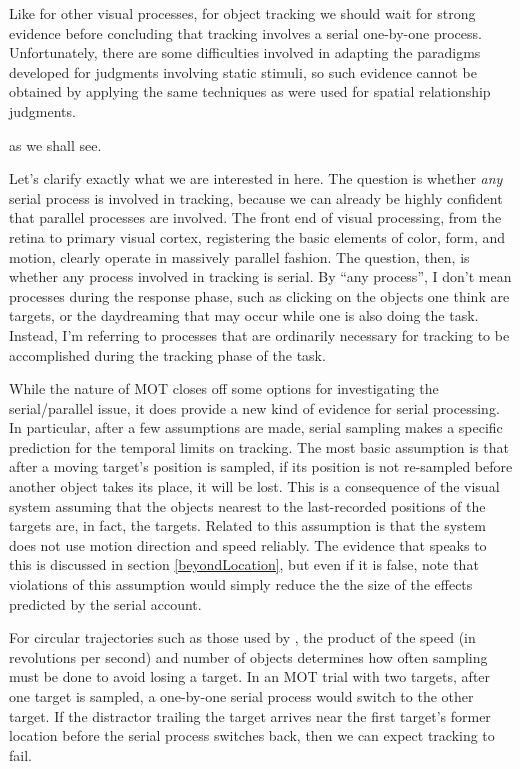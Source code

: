 \documentclass[
]{book}
\begin{document}
Like for other visual processes, for object tracking we should wait for strong evidence before concluding that tracking involves a serial one-by-one process. Unfortunately, there are some difficulties involved in adapting the paradigms developed for judgments involving static stimuli, so such evidence cannot be obtained by applying the same techniques as were used for spatial relationship judgments.

as we shall see.

Let's clarify exactly what we are interested in here. The question is whether \emph{any} serial process is involved in tracking, because we can already be highly confident that parallel processes are involved. The front end of visual processing, from the retina to primary visual cortex, registering the basic elements of color, form, and motion, clearly operate in massively parallel fashion. The question, then, is whether any process involved in tracking is serial. By ``any process'', I don't mean processes during the response phase, such as clicking on the objects one think are targets, or the daydreaming that may occur while one is also doing the task. Instead, I'm referring to processes that are ordinarily necessary for tracking to be accomplished during the tracking phase of the task.

While the nature of MOT closes off some options for investigating the serial/parallel issue, it does provide a new kind of evidence for serial processing. In particular, after a few assumptions are made, serial sampling makes a specific prediction for the temporal limits on tracking. The most basic assumption is that after a moving target's position is sampled, if its position is not re-sampled before another object takes its place, it will be lost. This is a consequence of the visual system assuming that the objects nearest to the last-recorded positions of the targets are, in fact, the targets. Related to this assumption is that the system does not use motion direction and speed reliably. The evidence that speaks to this is discussed in section \ref{beyondLocation}, but even if it is false, note that violations of this assumption would simply reduce the the size of the effects predicted by the serial account.

For circular trajectories such as those used by \citet{holcombeSplittingAttentionReduces2013}, the product of the speed (in revolutions per second) and number of objects determines how often sampling must be done to avoid losing a target. In an MOT trial with two targets, after one target is sampled, a one-by-one serial process would switch to the other target. If the distractor trailing the target arrives near the first target's former location before the serial process switches back, then we can expect tracking to fail.
\end{document}
